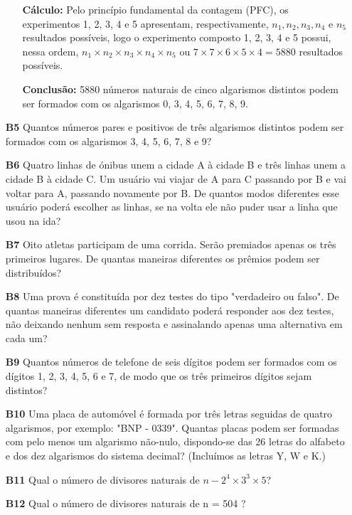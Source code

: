 \documentclass[a4paper,12pt]{article}
\begin{document}
\begin{enumerate}
\begin{itemize}
     \item[\ding{178}] \textbf{Cálculo:} Pelo princípio fundamental da contagem (PFC), os experimentos 1, 2, 3, 4 e 5 apresentam, respectivamente, $n_{1}, n_{2}, n_{3}, n_{4} \textrm{ e } n_{5}$ resultados possíveis, logo o experimento composto 1, 2, 3, 4 e 5 possui, nessa ordem, $n_{1} \times n_{2} \times n_{3} \times n_{4} \times n_{5}$ ou $7 \times 7 \times 6 \times 5 \times 4 = 5880$ resultados possíveis.
     \item[\ding{179}] \textbf{Conclusão:} 5880 números naturais de cinco algarismos distintos podem ser formados com os algarismos 0, 3, 4, 5, 6, 7, 8, 9. 
   \end{itemize}

\item[\textbf{B5}] Quantos números pares e positivos de três algarismos distintos podem ser formados com os algarismos 3, 4, 5, 6, 7, 8 e 9?

\item[\textbf{B6}] Quatro linhas de ónibus unem a cidade A à cidade B e três linhas unem a cidade B à cidade C. Um usuário vai viajar de A para C passando por B e vai voltar para A, passando novamente por B. De quantos modos diferentes esse usuário poderá escolher as linhas, se na volta ele não puder usar a linha que usou na ida? 

\item[\textbf{B7}] Oito atletas participam de uma corrida. Serão premiados apenas os três primeiros lugares. De quantas maneiras diferentes os prêmios podem ser distribuídos? 

\item[\textbf{B8}] Uma prova é constituída por dez testes do tipo "verdadeiro ou falso". De quantas maneiras diferentes um candidato poderá responder aos dez testes, não deixando nenhum sem resposta e assinalando apenas uma alternativa em cada um? 

\item[\textbf{B9}] Quantos números de telefone de seis dígitos podem ser formados com os dígitos 1, 2, 3, 4, 5, 6 e 7, de modo que os três primeiros dígitos sejam distintos? 

\item[\textbf{B10}] Uma placa de automóvel é formada por três letras seguidas de quatro algarismos, por exemplo: "BNP - 0339". Quantas placas podem ser formadas com pelo menos um algarismo não-nulo, dispondo-se das 26 letras do alfabeto e dos dez algarismos do sistema decimal? (Incluímos as letras Y, W e K.) 

\item[\textbf{B11}] Qual o número de divisores naturais de $n - 2^4 \times 3^3 \times 5$? 

\item[\textbf{B12}] Qual o número de divisores naturais de n = 504 ?  

\end{enumerate}
\end{document}
